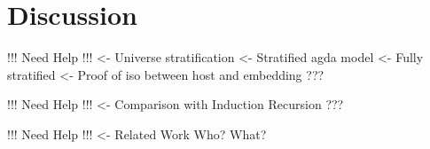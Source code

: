 \section{Discussion}
\label{sec:discussion}

\begin{structure}
!!! Need Help !!!
<- Universe stratification
    <- Stratified agda model
        <- Fully stratified
        <- Proof of iso between host and embedding
    ???
\end{structure}


\begin{structure}
!!! Need Help !!!
<- Comparison with Induction Recursion
    ???
\end{structure}


\begin{structure}
!!! Need Help !!!
<- Related Work
    Who? What?
\end{structure}

